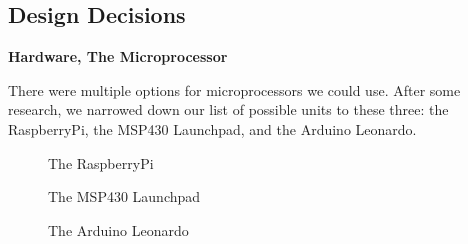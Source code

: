 \documentclass{report}
\begin{document}
\subsection*{Design Decisions}
\begin{center}
	\textbf{Hardware, The Microprocessor}
\end{center}
\indent
\indent
There were multiple options for microprocessors we could use. After some research, we narrowed down our list of possible units to these three: the RaspberryPi, the MSP430 Launchpad, and the Arduino Leonardo.
\newline
\begin{figure}[H]
	\caption{The RaspberryPi}
\end{figure}
\begin{figure}[H]
	\caption{The MSP430 Launchpad}
\end{figure}
\begin{figure}[H]
	\caption{The Arduino Leonardo}
\end{figure}
\end{document}
